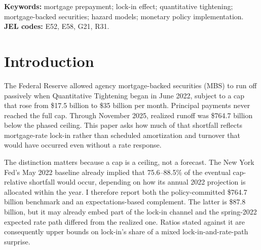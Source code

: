 \documentclass[12pt]{article}
\begin{document}
\begin{abstract}
headline. The margin is positive at every floor and elasticity-band combination tested (a specification check the rate configuration cannot let fail, retained as such), and its magnitude is unchanged under a floor calibrated only on the window's first nineteen months, an input-stability check rather than an outcome holdout: no outcome-holdout months exist anywhere in this design. An agent-based model of the moving decision recovers 13.6\% averaged across seeds, though a cross-design variant recalibrated on real loan covariates recovers 59.3\% on the frozen seed and 60.2\% averaged over fifty seeds (76.3\% reweighted to the book's composition). The contrast cannot be cleanly attributed to modeling paradigm. The mobility cost is real. The institutional cash-flow cost is small; its sign turns on the transplant's anchor, not on any within-anchor sensitivity sweep: importing Denmark's baseline mobility along with its payoff rule yields roughly $-\$100$ billion, while a transplant changing only the payoff rule yields $+\$61$ billion at the in-sample calibration point and $+\$28$ billion at the off-window calibration the headline marginal uses. The latter's positivity follows from anchoring the Danish leg at the U.S. zero-gap hazard on a book out of the money almost everywhere; the informative quantity there is the magnitude, not the sign.
\end{abstract}

\vspace{0.5\baselineskip}
{\footnotesize\noindent\textbf{Keywords:} mortgage prepayment; lock-in effect; quantitative tightening; mortgage-backed securities; hazard models; monetary policy implementation.\\
\textbf{JEL codes:} E52, E58, G21, R31.\par}
\newpage
\section{Introduction}\label{sec:intro}
The Federal Reserve allowed agency mortgage-backed securities (MBS) to run off
passively when Quantitative Tightening began in June 2022, subject to a cap that
rose from \$17.5 billion to \$35 billion per month. Principal payments never
reached the full cap. Through November 2025, realized runoff was \$764.7 billion
below the phased ceiling. This paper asks how much of that shortfall reflects
mortgage-rate lock-in rather than scheduled amortization and turnover that would
have occurred even without a rate response.

The distinction matters because a cap is a ceiling, not a forecast. The New York
Fed's May 2022 baseline already implied that 75.6--88.5\% of the eventual
cap-relative shortfall would occur, depending on how its annual 2022 projection
is allocated within the year. I therefore report both the policy-committed
\$764.7 billion benchmark and an expectations-based complement. The latter is
\$87.8 billion, but it may already embed part of the lock-in channel and the
spring-2022 expected rate path differed from the realized one. Ratios stated
against it are consequently upper bounds on lock-in's share of a mixed
lock-in-and-rate-path surprise.
\end{document}
